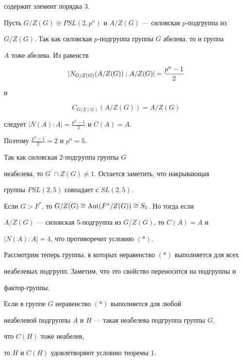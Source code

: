 \begin{pf}
содержит элемент порядка 3.


Пусть $G/Z(G)\cong PSL(2,p^n)$ и $A/Z(G)$ --- силовская $p$-подгруппа из


$G/Z(G)$. Так как силовская $p$-подгруппа группы $G$ абелева, то и группа


$A$ тоже абелева. Из равенств


$$


|N_{G/Z(G)}(A/Z(G)):A/Z(G)|=\ds{p^n-1}{2}


$$


и


$$


C_{G/Z(G)}(A/Z(G))=A/Z(G)


$$


следует $|N(A):A|=\frac{p^n-1}{2}$ и $C(A)=A$.


Поэтому $\frac{p^n-1}{2}=2$ и $p^n=5$.


Так как силовская 2-под\-груп\-па группы $G$


неабелева, то $G^\prime\cap Z(G)\ne 1$. Остается заметить, что накрывающая


группы $PSL(2,5)$ совпадает с $SL(2,5)$.





Если $G>F^*$, то $G/Z(G)\cong\operatorname{Aut}(F^*/Z(G))\cong S_5$. Но тогда если


$A/Z(G)$ --- силовская 5-подгруппа из $G/Z(G)$, то $C(A)=A$ и


$|N(A):A|=4$, что противоречит условию $(\ast)$.


\end{pf}





Рассмотрим теперь группы, в которых неравенство $(\ast)$ выполняется для всех


неабелевых подгрупп. Заметим, что это свойство переносится на подгруппы и


фактор-группы.





\begin{lemnonum}


Если в группе $G$ неравенство $(\ast)$ выполняется для любой


неабелевой подгруппы $A$ и $H$ --- такая неабелева подгруппа группы $G$,


что $C(H)$ тоже неабелев,


то $H$ и $C(H)$ удовлетворяют условию теоремы $1$.


\end{lemnonum}





